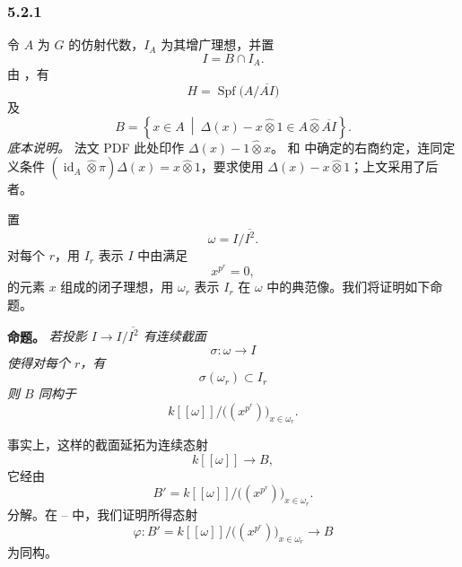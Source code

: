 
\subsubsection*{5.2.1}
\label{sga3:VIIB:5.2.1}

令 \(A\) 为 \(G\) 的仿射代数，\(I_A\) 为其增广理想，并置
\[
  I=B\cap I_A.
\]
由 ，有
\[
  H=\operatorname{Spf}\bigl(A/\overline{AI}\bigr)
\]
及
\[
  B
  =
  \left\{
    x\in A\ \middle|\
    \Delta(x)-x\widehat\otimes1
    \in A\widehat\otimes\overline{AI}
  \right\}.
\]
\label{sga3:VIIB:5.2.1:tensor-order-source-note}
\noindent\textit{底本说明。}\enspace
法文 PDF 此处印作 \(\Delta(x)-1\widehat\otimes x\)。 和  中确定的右商约定，连同定义条件 \((\operatorname{id}_A\widehat\otimes\pi)\Delta(x)
=x\widehat\otimes1\)，要求使用 \(\Delta(x)-x\widehat\otimes1\)；上文采用了后者。

置
\[
  \omega=I/\overline{I^2}.
\]
对每个 \(r\)，用 \(I_r\) 表示 \(I\) 中由满足
\[
  x^{p^r}=0,
\]
的元素 \(x\) 组成的闭子理想，用 \(\omega_r\) 表示 \(I_r\) 在 \(\omega\) 中的典范像。我们将证明如下命题。

\medskip
\noindent\textbf{命题。}
\label{sga3:VIIB:5.2.1:section-proposition}
{\itshape 若投影 \(I\to I/\overline{I^2}\) 有连续截面
\[
  \sigma:\omega\longrightarrow I
\]
使得对每个 \(r\)，有
\[
  \sigma(\omega_r)\subset I_r
\]
则 \(B\) 同构于
\[
  k[[\omega]]
  \big/
  \bigl((x^{p^r})\bigr)_{x\in\omega_r}.
\]}

事实上，这样的截面延拓为连续态射
\[
  k[[\omega]]\longrightarrow B,
\]
它经由
\[
  B'
  =
  k[[\omega]]
  \big/
  \bigl((x^{p^r})\bigr)_{x\in\omega_r}.
\]
分解。在 -- 中，我们证明所得态射
\[
  \varphi:
  B'
  =
  k[[\omega]]
  \big/
  \bigl((x^{p^r})\bigr)_{x\in\omega_r}
  \longrightarrow B
\]
为同构。
